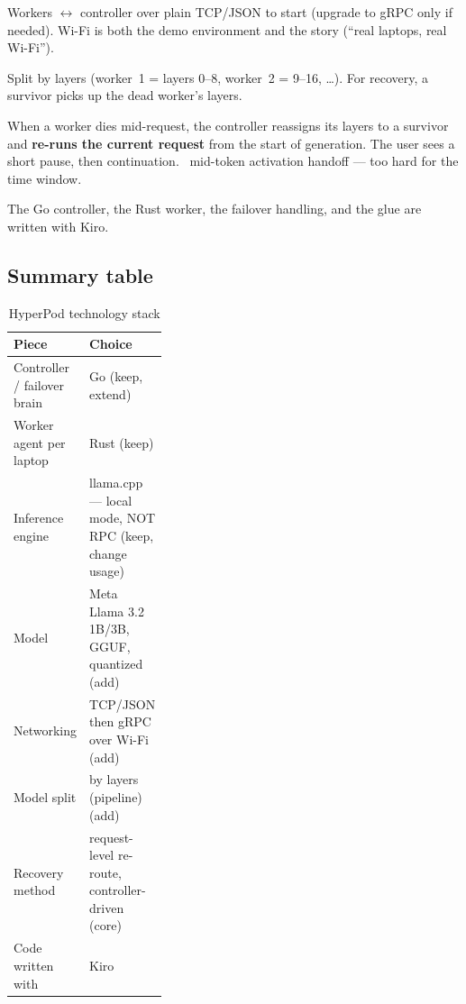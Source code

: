  Workers $\leftrightarrow$
controller over plain TCP/JSON to start (upgrade to gRPC only if needed). Wi-Fi
is both the demo environment and the story (``real laptops, real Wi-Fi'').

 Split by layers (worker~1 =
layers 0--8, worker~2 = 9--16, \ldots). For recovery, a survivor picks up the
dead worker's layers.

When a worker dies mid-request, the controller reassigns its layers to a survivor
and \textbf{re-runs the current request} from the start of generation. The user
sees a short pause, then continuation. \Drop\ mid-token activation handoff --- too
hard for the time window.

 The Go controller, the Rust worker, the
failover handling, and the glue are written with Kiro.

\subsection{Summary table}
\begin{table}[h]
\centering\footnotesize
\caption{HyperPod technology stack}
\label{tab:stack}
\begin{tabularx}{\linewidth}{L{0.34\linewidth}Y}
\toprule
Piece & Choice \\
\midrule
Controller / failover brain & Go (keep, extend) \\
Worker agent per laptop & Rust (keep) \\
Inference engine & llama.cpp --- local mode, NOT RPC (keep, change usage) \\
Model & Meta Llama 3.2 1B/3B, GGUF, quantized (add) \\
Networking & TCP/JSON then gRPC over Wi-Fi (add) \\
Model split & by layers (pipeline) (add) \\
Recovery method & request-level re-route, controller-driven (core) \\
Code written with & Kiro \\
\bottomrule
\end{tabularx}
\end{table}
